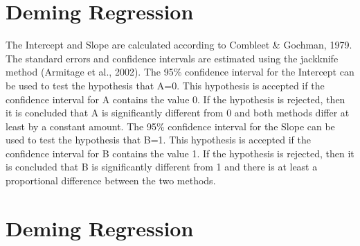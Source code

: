 \documentclass[12pt, a4paper]{report}
\theoremstyle{plain}
\theoremstyle{definition}
\theoremstyle{remark}
\begin{document}
\section{Deming Regression}
The Intercept and Slope are calculated according to Combleet \& Gochman, 1979. The standard errors and confidence intervals are estimated using the jackknife method (Armitage et al., 2002).
The 95\% confidence interval for the Intercept can be used to test the hypothesis that A=0. This hypothesis is accepted if the confidence interval for A contains the value 0. If the hypothesis is rejected, then it is concluded that A is significantly different from 0 and both methods differ at least by a constant amount.
The 95\% confidence interval for the Slope can be used to test the hypothesis that B=1. This hypothesis is accepted if the confidence interval for B contains the value 1. If the hypothesis is rejected, then it is concluded that B is significantly different from 1 and there is at least a proportional difference between the two methods.



\section{Deming Regression}
\end{document}
